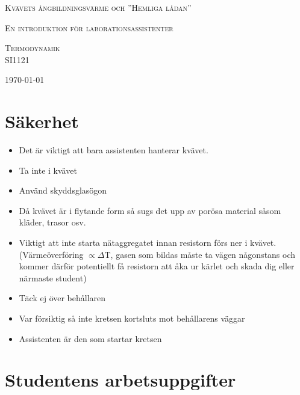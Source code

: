 \documentclass[11pt]{article}
\begin{document}
\begin{titlepage}
	\centering
	{\scshape\LARGE Kvävets ångbildningsvärme och ”Hemliga lådan” \par}
	{\scshape En introduktion för laborationsassistenter \par}
	\vspace{4cm}
	{\scshape\Large Termodynamik \\ SI1121\par}
	\vspace{2cm}
	\vfill
	{\large \today\par}
\end{titlepage}


\section{Säkerhet}
 
\begin{itemize}
    \item Det är viktigt att bara assistenten hanterar kvävet.
    \item Ta inte i kvävet
    \item Använd skyddsglasögon
    \item Då kvävet är i flytande form så sugs det upp av porösa material såsom kläder, trasor osv.
    \item Viktigt att inte starta nätaggregatet innan resistorn förs ner i kvävet. (Värmeöverföring $\propto \Delta $T, gasen som bildas måste ta vägen någonstans och kommer därför potentiellt få resistorn att åka ur kärlet och skada dig eller närmaste student)
    \item Täck ej över behållaren
    \item Var försiktig så inte kretsen kortsluts mot behållarens väggar
    \item Assistenten är den som startar kretsen
\end{itemize}

\section{Studentens arbetsuppgifter}
\end{document}

